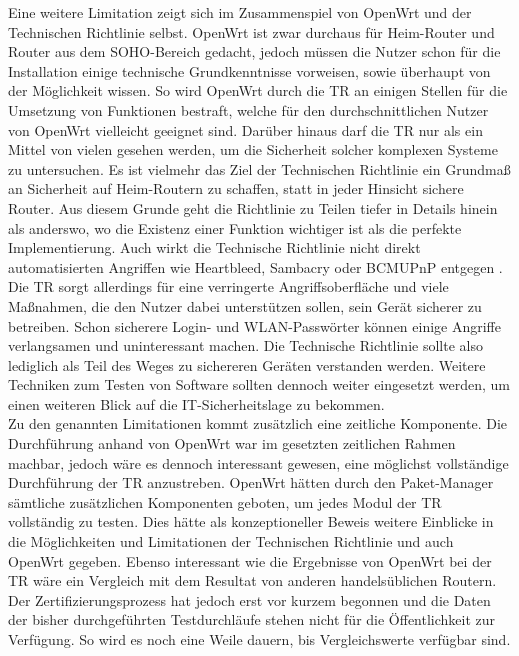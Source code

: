 \documentclass[a4paper]{book}
\begin{document}
\begin{large}
\begin{onehalfspace}
 	Eine weitere Limitation zeigt sich im Zusammenspiel von OpenWrt und der Technischen Richtlinie selbst. OpenWrt ist zwar durchaus für Heim-Router und Router aus dem SOHO-Bereich gedacht, jedoch müssen die Nutzer schon für die Installation einige technische Grundkenntnisse vorweisen, sowie überhaupt von der Möglichkeit wissen. So wird OpenWrt durch die TR an einigen Stellen für die Umsetzung von Funktionen bestraft, welche für den durchschnittlichen Nutzer von OpenWrt vielleicht geeignet sind. Darüber hinaus darf die TR nur als ein Mittel von vielen gesehen werden, um die Sicherheit solcher komplexen Systeme zu untersuchen. Es ist vielmehr das Ziel der Technischen Richtlinie ein Grundmaß an Sicherheit auf Heim-Routern zu schaffen, statt in jeder Hinsicht sichere Router. Aus diesem Grunde geht die Richtlinie zu Teilen tiefer in Details hinein als anderswo, wo die Existenz einer Funktion wichtiger ist als die perfekte Implementierung. Auch wirkt die Technische Richtlinie nicht direkt automatisierten Angriffen wie Heartbleed, Sambacry  oder BCMUPnP entgegen \cite{Carvalho.2014, Carvalho.2014, Konoth.29.01.2019}. Die TR sorgt allerdings für eine verringerte Angriffsoberfläche und viele Maßnahmen, die den Nutzer dabei unterstützen sollen, sein Gerät sicherer zu betreiben. Schon sicherere Login- und WLAN-Passwörter können einige Angriffe verlangsamen und uninteressant machen. Die Technische Richtlinie sollte also lediglich als Teil des Weges zu sichereren Geräten verstanden werden. Weitere Techniken zum Testen von Software sollten dennoch weiter eingesetzt werden, um einen weiteren Blick auf die IT-Sicherheitslage zu bekommen. 	\\ \indent
	Zu den genannten Limitationen kommt zusätzlich eine zeitliche Komponente. Die Durchführung anhand von OpenWrt war im gesetzten zeitlichen Rahmen machbar, jedoch wäre es dennoch interessant gewesen, eine möglichst vollständige Durchführung der TR anzustreben. OpenWrt hätten durch den Paket-Manager sämtliche zusätzlichen Komponenten geboten, um jedes Modul der TR vollständig zu testen. Dies hätte als konzeptioneller Beweis weitere Einblicke in die Möglichkeiten und Limitationen der Technischen Richtlinie und auch OpenWrt gegeben. Ebenso interessant wie die Ergebnisse von OpenWrt bei der TR wäre ein Vergleich mit dem Resultat von anderen handelsüblichen Routern. Der Zertifizierungsprozess hat jedoch erst vor kurzem begonnen und die Daten der bisher durchgeführten Testdurchläufe stehen nicht für die Öffentlichkeit zur Verfügung. So wird es noch eine Weile dauern, bis Vergleichswerte verfügbar sind.	\\ \indent

\end{onehalfspace}
\end{large}
\end{document}
